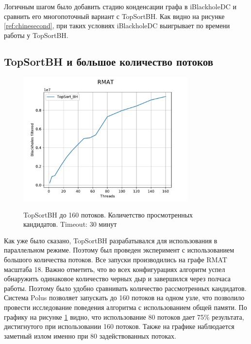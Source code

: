 \documentclass[12pt,a4paper,oneside,openany]{article}
\theoremstyle{definition}
\theoremstyle{lemma}
\theoremstyle{remark}
\begin{document}
Логичным шагом было добавить стадию конденсации графа в iBlackholeDC и сравнить его
многопоточный вариант с TopSortBH. Как видно на рисунке \ref{ref:chinesecond},
при таких условиях iBlackholeDC выигрывает по времени работы у TopSortBH.

\subsection{TopSortBH и большое количество потоков}\label{subsec:topsortasync}

\begin{figure}[H]
    \centering
    \includegraphics[width=0.8\textwidth]{images/many_threads_RMAT.pdf}
    \label{fig:manythreads}
    \caption{TopSortBH до 160 потоков. Количетство просмотренных кандидатов. Timeout: 30 минут}
\end{figure}

Как уже было сказано, TopSortBH разрабатывался для использования в параллельном режиме. Поэтому
был проведен эксперимент с использованием большого количества потоков.
Все запуски производились на графе RMAT масштаба 18.
Важно отметить, что во всех конфигурациях алгоритм успел обнаружить одинаковое количество черных дыр
и завершился через полчаса работы. Поэтому было удобно сравнивать количество рассмотренных кандидатов.
Система Polus позволяет запускать до 160 потоков на одном узле, что позволило провести исследование
поведения алгоритма с использованием общей памяти.
По графику на рисунке \ref{fig:manythreads} видно, что использование 80 потоков дает 75\%
результата, дистигнутого при использовании 160 потоков. Также на графике наблюдается
заметный излом именно при 80 задействованных потоках.
\end{document}
